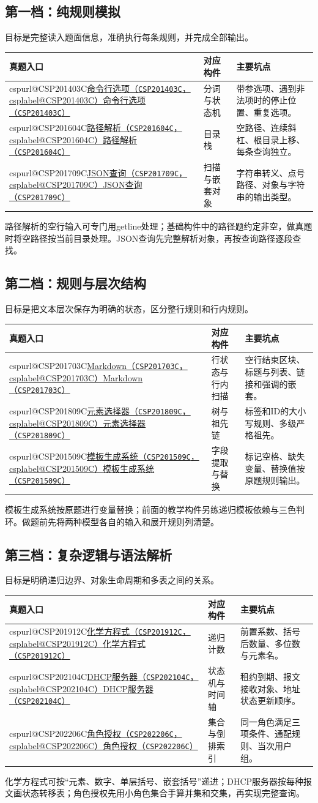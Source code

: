 \documentclass[UTF8,11pt,a4paper,fontset=none]{ctexart}
\makeatletter
\newcommand{\csp}[2]{\ifcsname cspurl@#1\endcsname\href{\csname cspurl@#1\endcsname}{#2（\texttt{#1}，\csname csplabel@#1\endcsname）}\else\href{https://oj.shumeng.tech/p/#1}{#2（\texttt{#1}）}\fi}
\makeatother
\begin{document}
\subsection{第一档：纯规则模拟}
目标是完整读入题面信息，准确执行每条规则，并完成全部输出。
\begin{longtable}{P{5.8cm}P{3cm}P{4.9cm}}
\toprule 真题入口 & 对应构件 & 主要坑点\\\midrule\endhead
\csp{CSP201403C}{命令行选项} & 分词与状态机 & 带参选项、遇到非法项时的停止位置、重复选项。\\
\csp{CSP201604C}{路径解析} & 目录栈 & 空路径、连续斜杠、根目录上移、每条查询独立。\\
\csp{CSP201709C}{JSON查询} & 扫描与嵌套对象 & 字符串转义、点号路径、对象与字符串的输出类型。\\
\bottomrule\end{longtable}
路径解析的空行输入可专门用getline处理；基础构件中的路径题约定非空，做真题时将空路径按当前目录处理。JSON查询先完整解析对象，再按查询路径逐段查找。

\subsection{第二档：规则与层次结构}
目标是把文本层次保存为明确的状态，区分整行规则和行内规则。
\begin{longtable}{P{5.8cm}P{3cm}P{4.9cm}}
\toprule 真题入口 & 对应构件 & 主要坑点\\\midrule\endhead
\csp{CSP201703C}{Markdown} & 行状态与行内扫描 & 空行结束区块、标题与列表、链接和强调的嵌套。\\
\csp{CSP201809C}{元素选择器} & 树与祖先链 & 标签和ID的大小写规则、多级严格祖先。\\
\csp{CSP201509C}{模板生成系统} & 字段提取与替换 & 标记空格、缺失变量、替换值按原题规则输出。\\
\bottomrule\end{longtable}
模板生成系统按原题进行变量替换；前面的教学构件另练递归模板依赖与三色判环。做题前先将两种模型各自的输入和展开规则列清楚。

\subsection{第三档：复杂逻辑与语法解析}
目标是明确递归边界、对象生命周期和多表之间的关系。
\begin{longtable}{P{5.8cm}P{3cm}P{4.9cm}}
\toprule 真题入口 & 对应构件 & 主要坑点\\\midrule\endhead
\csp{CSP201912C}{化学方程式} & 递归计数 & 前置系数、括号后数量、多位数与元素名。\\
\csp{CSP202104C}{DHCP服务器} & 状态机与时间轴 & 租约到期、报文接收对象、地址状态更新顺序。\\
\csp{CSP202206C}{角色授权} & 集合与倒排索引 & 同一角色满足三项条件、通配规则、当次用户组。\\
\bottomrule\end{longtable}
化学方程式可按“元素、数字、单层括号、嵌套括号”递进；DHCP服务器按每种报文画状态转移表；角色授权先用小角色集合手算并集和交集，再实现完整查询。
\end{document}

